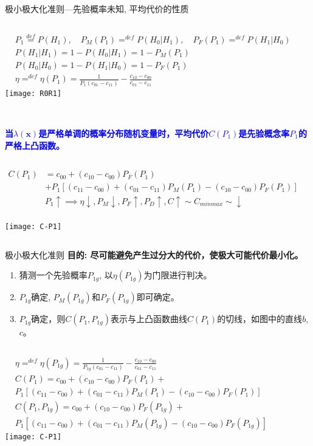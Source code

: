 \begin{frame}[shrink]{极小极大化准则---先验概率未知, 平均代价的性质}
\begin{columns}
	\small
	\begin{align*}
	&P_1\mathop{=}\limits^{def}P(H_1),\quad P_M(P_1)\mathop{=}^{def}P(H_0|H_1),\quad P_F(P_1)\mathop{=}^{def}P(H_1|H_0)\\
	&P(H_1|H_1)=1-P(H_0|H_1)=1-P_M(P_1)\\
	&P(H_0|H_0)=1-P(H_1|H_0)=1-P_F(P_1)\\
	&\eta\mathop{=}^{def}\eta(P_1)=\frac{1}{P_1(c_{01}-c_{11})}-\frac{c_{10}-c_{00}}{c_{01}-c_{11}}
	\end{align*}
	\texttt{[image: R0R1]}
\end{columns}
~\\
\textbf{\textcolor{blue}{当$\lambda(\bm{x})$是严格单调的概率分布随机变量时，平均代价$C(P_1)$是先验概念率$P_1$的严格上凸函数。}}
\begin{columns}
	\begin{align*}
	C(P_1)&=c_{00}+(c_{10}-c_{00})P_F(P_1)\\
	&+P_1[(c_{11}-c_{00})+(c_{01}-c_{11})P_M(P_1)-(c_{10}-c_{00})P_F(P_1)]\\
	&P_1\uparrow\implies \eta\downarrow, P_M\downarrow, P_F\uparrow, P_D\uparrow, C\uparrow\sim C_{minmax}\sim\downarrow
	\end{align*}
	~\\
	\centering
	\texttt{[image: C-P1]}
\end{columns}
\end{frame}

\begin{frame}[shrink]{极小极大化准则}
\textbf{目的: 尽可能避免产生过分大的代价，使极大可能代价最小化。}
\begin{enumerate}
	\item 猜测一个先验概率$P_{1g}$, 以$\eta(P_{1g})$为门限进行判决。
	\item $P_{1g}$确定, $P_M(P_{1g})$和$P_F(P_{1g})$即可确定。
	\item $P_{1g}$确定，则$C(P_1,P_{1g})$表示与上凸函数曲线$C(P_1)$的切线，如图中的直线$b$, $c$。
\end{enumerate}
\begin{columns}
	\begin{align*}
	&\eta\mathop{=}^{def}\eta(P_{1g})=\frac{1}{P_{1g}(c_{01}-c_{11})}-\frac{c_{10}-c_{00}}{c_{01}-c_{11}}\\
	&C(P_1)=c_{00}+(c_{10}-c_{00})P_F(P_1)+\\
	&P_1[(c_{11}-c_{00})+(c_{01}-c_{11})P_M(P_1)-(c_{10}-c_{00})P_F(P_1)]\\
	&C(P_1,P_{1g})=c_{00}+(c_{10}-c_{00})P_F(P_{1g})+\\
	&P_1[(c_{11}-c_{00})+(c_{01}-c_{11})P_M(P_{1g})-(c_{10}-c_{00})P_F(P_{1g})]
	\end{align*}
	\centering
	\texttt{[image: C-P1]}
\end{columns}
\end{frame}

